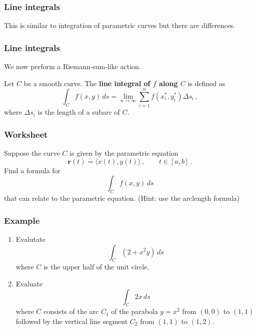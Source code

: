 \documentclass[aspectratio=169]{beamer}
\newcommand{\vect}{\mathbf}
\begin{document}
\begin{frame}
    \frametitle{Line integrals}
    This is similar to integration of parametric curves but 
    there are differences.
\end{frame}

\begin{frame}
    \frametitle{Line integrals}
    We now perform a Riemann-sum-like action.
    \begin{definition}
    Let $C$ be a smooth curve.
    The \textbf{line integral of $f$ along $C$} is defined as
    \begin{equation*}
        \int_C f(x,y) \, ds = \lim_{n\to \infty} \sum_{i=1}^n f(x_i^*, y_i^*) \Delta s_i \,,
    \end{equation*}
    where $\Delta s_i$ is the length of a subarc of $C$.
    \end{definition}
\end{frame}

\begin{frame}
    \frametitle{Worksheet}
    Suppose the curve $C$ is given by the parametric equation
    \begin{equation*}
        \vect{r}(t) = \langle x(t), y(t) \rangle \,, \qquad t\in [a,b]\,.
    \end{equation*}
    Find a formula for 
    \begin{equation*}
        \int_C f(x,y) \, ds 
    \end{equation*}
    that can relate to the parametric equation.
    (Hint: use the arclength formula)
\end{frame}

\begin{frame}
    \frametitle{Example}
    \begin{enumerate}
        \item Evalutate
            \begin{equation*}
                \int_C (2 + x^2y) \, ds
            \end{equation*}
            where $C$ is the upper half of the unit circle.
        \item Evaluate 
            \begin{equation*}
                \int_C 2x \, ds
            \end{equation*}
            where $C$ consists of the arc $C_1$ of the parabola $y=x^2$ from
        $(0,0)$ to $(1,1)$ followed by the vertical line segment $C_2$ from $(1,1)$ to $(1,2)$.
    \end{enumerate}
\end{frame}
\end{document}

